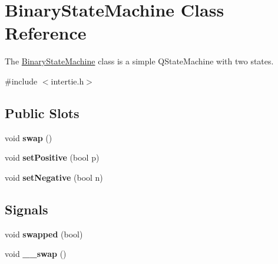 \hypertarget{class_binary_state_machine}{\section{\-Binary\-State\-Machine \-Class \-Reference}
\label{class_binary_state_machine}
}


\-The \hyperlink{class_binary_state_machine}{\-Binary\-State\-Machine} class is a simple \-Q\-State\-Machine with two states.  




{\ttfamily \#include $<$intertie.\-h$>$}

\subsection*{\-Public \-Slots}
\begin{DoxyCompactItemize}
\item 
\hypertarget{class_binary_state_machine_a797936cea8c62cc1147fdfae5c4668dc}{void {\bfseries swap} ()}\label{class_binary_state_machine_a797936cea8c62cc1147fdfae5c4668dc}

\item 
\hypertarget{class_binary_state_machine_a19e75b5bbab7ffd29b18b48f56db1466}{void {\bfseries set\-Positive} (bool p)}\label{class_binary_state_machine_a19e75b5bbab7ffd29b18b48f56db1466}

\item 
\hypertarget{class_binary_state_machine_ae3d601827e27a6fa9cac36744c8fe46c}{void {\bfseries set\-Negative} (bool n)}\label{class_binary_state_machine_ae3d601827e27a6fa9cac36744c8fe46c}

\end{DoxyCompactItemize}
\subsection*{\-Signals}
\begin{DoxyCompactItemize}
\item 
\hypertarget{class_binary_state_machine_a2117c089728ebb9b4aa8c1598f655e15}{void {\bfseries swapped} (bool)}\label{class_binary_state_machine_a2117c089728ebb9b4aa8c1598f655e15}

\item 
\hypertarget{class_binary_state_machine_adc76e49054c18bfb19de3e2d53da0362}{void {\bfseries \-\_\-\-\_\-swap} ()}\label{class_binary_state_machine_adc76e49054c18bfb19de3e2d53da0362}

\end{DoxyCompactItemize}
